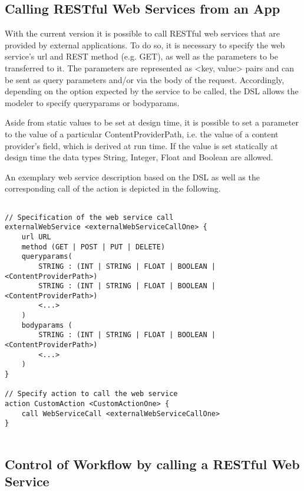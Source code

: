 
\subsection{Calling RESTful Web Services from an App}
\label{subsec: CallingWebServices}
With the current \MD version it is possible to call RESTful web services that are provided by external applications. To do so, it is necessary to specify the web service's url and REST method (e.g. GET), as well as the parameters to be transferred to it. The parameters are represented as <key, value> pairs and can be sent as query parameters and/or via the body of the request. Accordingly, depending on the option expected by the service to be called, the DSL allows the modeler to specify queryparams or bodyparams. 

Aside from static values to be set at design time, it is possible to set a parameter to the value of a particular ContentProviderPath, i.e. the value of a content provider's field, which is derived at run time. If the value is set statically at design time the data types String, Integer, Float and Boolean are allowed. 

An exemplary web service description based on the DSL as well as the corresponding call of the action is depicted in the following.

\begin{lstlisting}[language=MD2, label=lst:callWSfromWF, caption=Calling a Web Service From Within a Workflow]

// Specification of the web service call
externalWebService <externalWebServiceCallOne> {
	url URL
	method (GET | POST | PUT | DELETE)
	queryparams(
		STRING : (INT | STRING | FLOAT | BOOLEAN | <ContentProviderPath>)	
		STRING : (INT | STRING | FLOAT | BOOLEAN | <ContentProviderPath>)
		<...>	
	)
	bodyparams (
		STRING : (INT | STRING | FLOAT | BOOLEAN | <ContentProviderPath>)
		<...>
	)
}

// Specify action to call the web service
action CustomAction <CustomActionOne> {
	call WebServiceCall <externalWebServiceCallOne>
}
	
\end{lstlisting}





\subsection{Control of Workflow by calling a RESTful Web Service}
\label{subsec: WorkflowControlThroughWS}

